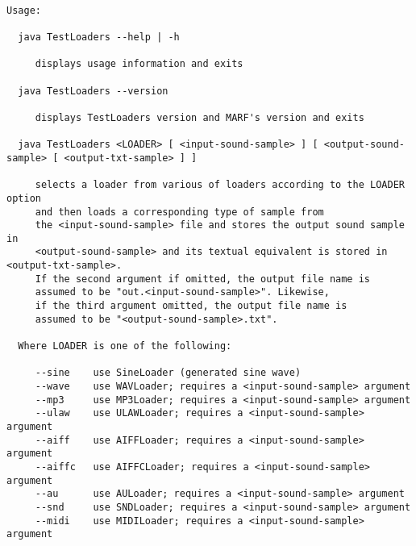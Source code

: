 \begin{verbatim}

Usage:

  java TestLoaders --help | -h

     displays usage information and exits

  java TestLoaders --version

     displays TestLoaders version and MARF's version and exits

  java TestLoaders <LOADER> [ <input-sound-sample> ] [ <output-sound-sample> [ <output-txt-sample> ] ]

     selects a loader from various of loaders according to the LOADER option
     and then loads a corresponding type of sample from
     the <input-sound-sample> file and stores the output sound sample in
     <output-sound-sample> and its textual equivalent is stored in <output-txt-sample>.
     If the second argument if omitted, the output file name is
     assumed to be "out.<input-sound-sample>". Likewise,
     if the third argument omitted, the output file name is
     assumed to be "<output-sound-sample>.txt".

  Where LOADER is one of the following:

     --sine    use SineLoader (generated sine wave)
     --wave    use WAVLoader; requires a <input-sound-sample> argument
     --mp3     use MP3Loader; requires a <input-sound-sample> argument
     --ulaw    use ULAWLoader; requires a <input-sound-sample> argument
     --aiff    use AIFFLoader; requires a <input-sound-sample> argument
     --aiffc   use AIFFCLoader; requires a <input-sound-sample> argument
     --au      use AULoader; requires a <input-sound-sample> argument
     --snd     use SNDLoader; requires a <input-sound-sample> argument
     --midi    use MIDILoader; requires a <input-sound-sample> argument

\end{verbatim}
